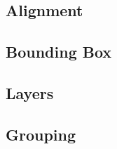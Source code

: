 \begin{comment}
\href{\docurl\#pgfp./pgfplots/scale:mode}{\opt{scale mode}} = auto | none | stretch to fill | scale uniformly \\
\href{\docurl\#pgfp./pgfplots/scale:uniformly:strategy}{\opt{scale uniformly strategy}} = auto | units only | change vertical limits | change horizontal lines\\
\href{\docurl\#pgfp./pgfplots/unit:rescale:keep:size}{\opt{unit rescale keep size}} = true | false | unless limits declared | limits declared\\
\end{comment}





\subsection*{Alignment}





\subsection*{Bounding Box}






\subsection*{Layers}






\subsection*{Grouping}


